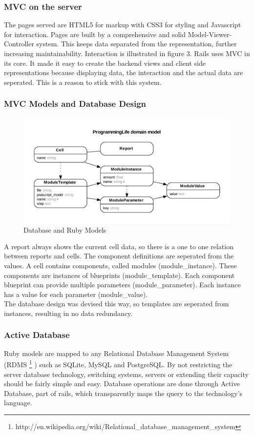 \documentclass{report}
\begin{document}
				\subsubsection{MVC on the server}
					The pages served are HTML5 for markup with CSS3 for styling and Javascript for interaction. Pages are built by a comprehensive and solid Model-Viewer-Controller system. This keeps data separated from the representation, further increasing maintainability. Interaction is illustrated in figure 3. Rails uses MVC in its core. It made it easy to create the backend views and client side representations because displaying data, the interaction and the actual data are seperated. This is a reason to stick with this system.
				\subsubsection{MVC Models and Database Design}
					\begin{figure}[htb]
						\begin{center}
							\includegraphics[width=\linewidth]{erd.pdf}
							\caption{Database and Ruby Models}
							\label{fig: erd}
						\end{center}
					\end{figure}	
					A report always shows the current cell data, so there is a one to one relation between reports and cells. The component definitions are seperated from the values. A cell contains components, called modules (module\_instance). These components are instances of blueprints (module\_template). Each component blueprint can provide multiple parameters (module\_parameter). Each instance has a value for each parameter (module\_value).\\
					The database design was devised this way, so templates are seperated from instances, resulting in no data redundancy.
				\subsubsection{Active Database}
					Ruby models are mapped to any Relational Database Management System (RDMS \footnote{http://en.wikipedia.org/wiki/Relational\_database\_management\_system} ) such as SQLite, MySQL and PostgreSQL. By not restricting the server database technology, switching systems, servers or extending their capacity should be fairly simple and easy. Database operations are done through Active Database, part of rails, which transparently maps the query to the technology's language.
\end{document}
